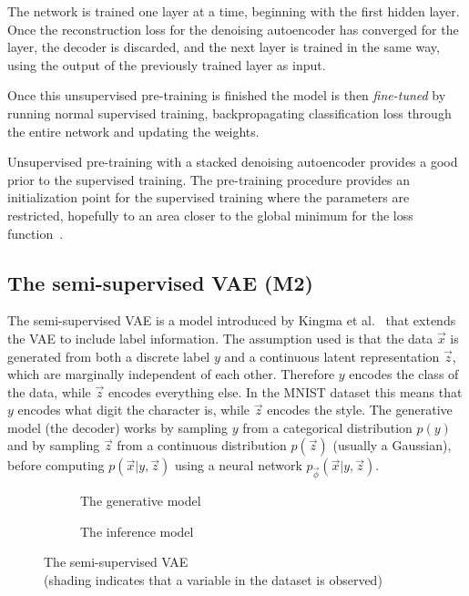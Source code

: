 The network is trained one layer at a time, beginning with the first hidden layer. Once the reconstruction loss for the denoising autoencoder has 
converged for the layer, the decoder is discarded, and the next layer is trained in the same way, using the output of the previously trained
layer as input.

Once this unsupervised pre-training is finished the model is then \textit{fine-tuned} by running normal supervised training, backpropagating
classification loss through the entire network and updating the weights.

Unsupervised pre-training with a stacked denoising autoencoder provides a good prior to the supervised training.
The pre-training procedure provides an initialization point for the supervised training where the parameters are restricted, hopefully to an area 
closer to the global minimum for the loss function~\cite{Erhan:2010:WUP:1756006.1756025}.

\subsection{The semi-supervised VAE (M2)} \label{ssVAE}

The semi-supervised VAE is a model introduced by Kingma et al.~\cite{DBLP:journals/corr/KingmaRMW14} that extends the VAE to include label information. 
The assumption used is that the data $\vec{x}$ is generated from both a discrete label $y$ and a continuous latent representation 
$\vec{z}$, which are marginally independent of each other.
Therefore $y$ encodes the class of the data, while $\vec{z}$ encodes everything else. In the MNIST dataset this means that $y$ encodes
what digit the character is, while $\vec{z}$ encodes the style. The generative model (the decoder) works by sampling $y$ from a 
categorical distribution $p(y)$ and by sampling $\vec{z}$ from a continuous distribution $p(\vec{z})$ (usually a Gaussian), before computing 
$p(\vec{x}|y, \vec{z})$ using a neural network $p_{\vec{\phi}}(\vec{x}|y, \vec{z})$.
\begin{figure}[H]
  \centering
  \begin{subfigure}[b]{0.4\linewidth}
    \centering
    \scalebox{.75}{}
    \caption{The generative model}
  \end{subfigure}
  \begin{subfigure}[b]{0.4\linewidth}
    \centering
    \scalebox{.75}{}
    \caption{The inference model}
  \end{subfigure}
  \caption[Semi-supervised VAE]{The semi-supervised VAE \\ (shading indicates that a variable in the dataset is observed)}
  \label{fig:ss_vae}
\end{figure}

